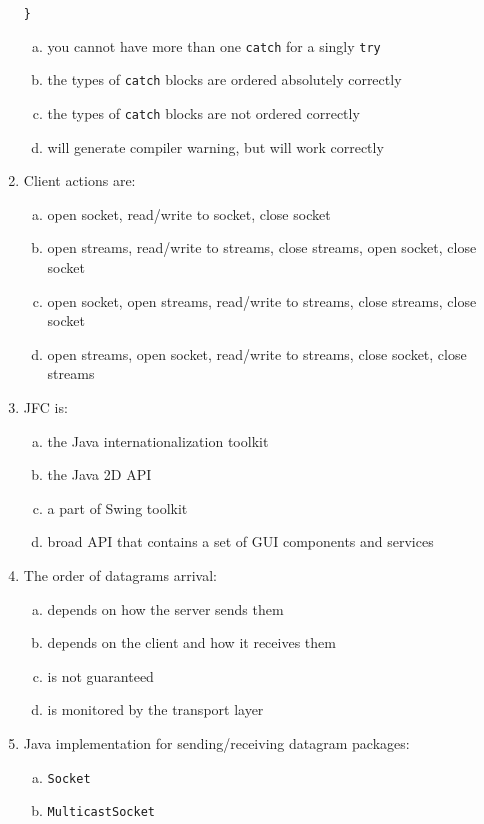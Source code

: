 \documentclass[10pt,a4paper,twocolumn]{article}
\begin{document}
\begin{enumerate}
\begin{verbatim}
}
\end{verbatim}
\begin{enumerate}[(a)]
	\item you cannot have more than one \texttt{catch} for a singly \texttt{try}
	\item the types of \texttt{catch} blocks are ordered absolutely correctly
	\item the types of \texttt{catch} blocks are not ordered correctly
	\item will generate compiler warning, but will work correctly
\end{enumerate}
\item Client actions are:
\begin{enumerate}[(a)]
	\item open socket, read/write to socket,  close socket
	\item open streams, read/write to streams, close streams, open socket, close socket
	\item open socket, open streams, read/write to streams, close streams, close socket
	\item open streams, open socket, read/write to streams,  close socket, close streams
\end{enumerate}
\item JFC is:
\begin{enumerate}[(a)]
	\item the Java internationalization toolkit
	\item the Java 2D API
	\item a part of Swing toolkit
	\item broad API that contains a set of GUI components and services
\end{enumerate}
\item The order of datagrams arrival:
\begin{enumerate}[(a)]
	\item depends on how the server sends them
	\item depends on the client and how it receives them
	\item is not guaranteed
	\item is monitored by the transport layer
\end{enumerate}
\item Java implementation for sending/receiving datagram packages:
\begin{enumerate}[(a)]
	\item \texttt{Socket}
	\item \texttt{MulticastSocket}

\end{enumerate}
\end{enumerate}
\end{document}
